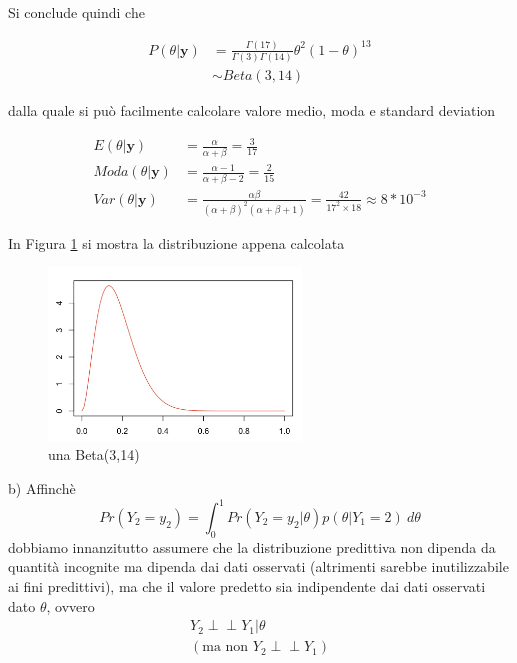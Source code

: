 Si conclude quindi che

\begin{align*}
    P(\theta|\textbf{y}) &= \frac{\Gamma(17)}{\Gamma(3)\Gamma(14)} \theta^2(1-\theta)^{13} \\
    &\sim Beta(3,14)
\end{align*}

dalla quale si può facilmente calcolare valore medio, moda e standard deviation

\begin{align*}
    E(\theta|\textbf{y}) &= \frac{\alpha}{\alpha + \beta} = \frac{3}{17}\\
    Moda(\theta|\textbf{y}) &= \frac{\alpha-1}{\alpha + \beta-2} = \frac{2}{15}\\
    Var(\theta|\textbf{y}) &= \frac{\alpha\beta}{(\alpha + \beta)^2(\alpha + \beta + 1)} = \frac{42}{17^2\times 18} \approx 8*10^{-3}
\end{align*}

In Figura \ref{fig:beta} si mostra la distribuzione appena calcolata

\begin{figure}[!ht]
\centering
\includegraphics[width=0.6\textwidth]{img/esercizio3-07-Beta314}
\caption{una Beta(3,14)}
\label{fig:beta}
\end{figure}

b) Affinchè
\begin{equation} \label{eq:1}
    Pr(Y_2=y_2) = \int_0^1 Pr(Y_2=y_2|\theta)p(\theta|Y_1=2) \ d\theta
\end{equation}
dobbiamo innanzitutto assumere che la distribuzione predittiva non dipenda da quantità 
incognite ma dipenda dai dati osservati (altrimenti sarebbe inutilizzabile ai fini 
predittivi), ma che il valore predetto sia indipendente dai dati osservati dato $\theta$, ovvero 
\begin{align*}
    Y_2 \perp\!\!\!\perp Y_1 | \theta \\
    (\text{ma non } Y_2 \perp\!\!\!\perp Y_1)
\end{align*}

